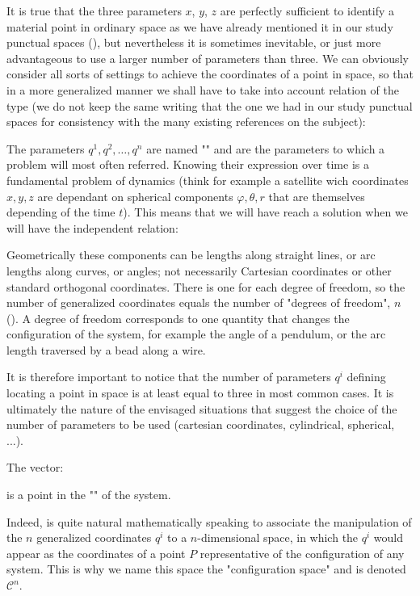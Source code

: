 	It is true that the three parameters $x$, $y$, $z$ are perfectly sufficient to identify a material point in ordinary space as we have already mentioned it in our study punctual spaces (), but nevertheless it is sometimes inevitable, or just more advantageous to use a larger number of parameters than three. We can obviously consider all sorts of settings to achieve the coordinates of a point in space, so that in a more generalized manner we shall have to take into account relation of the type (we do not keep the same writing that the one we had in our study punctual spaces for consistency with the many existing references on the subject):
	
	The parameters $q^1,q^2,\ldots,q^n$ are named "" and are the parameters to which a problem will most often referred. Knowing their expression over time is a fundamental problem of dynamics (think for example a satellite wich coordinates $x,y,z$ are dependant on spherical components $\varphi,\theta,r$ that are themselves depending of the time $t$). This means that we will have reach a solution when we will have the independent relation:
	
	Geometrically these components can be lengths along straight lines, or arc lengths along curves, or angles; not necessarily Cartesian coordinates or other standard orthogonal coordinates. There is one for each degree of freedom, so the number of generalized coordinates equals the number of "degrees of freedom", $n$ (). A degree of freedom corresponds to one quantity that changes the configuration of the system, for example the angle of a pendulum, or the arc length traversed by a bead along a wire.
	
	It is therefore important to notice that the number of parameters $q^i$ defining locating a point in space is at least equal to three in most common cases. It is ultimately the nature of the envisaged situations that suggest the choice of the number of parameters to be used (cartesian coordinates, cylindrical, spherical, ...).
	
	The vector:
	
	 is a point in the "" of the system.
	 
	 Indeed, is quite natural mathematically speaking to associate the manipulation of the $n$ generalized coordinates $q^i$ to a $n$-dimensional space, in which the $q^i$ would appear as the coordinates of a point $P$ representative of the configuration of any system. This is why we name this space the "configuration space" and is denoted $\mathcal{C}^n$.
	 

